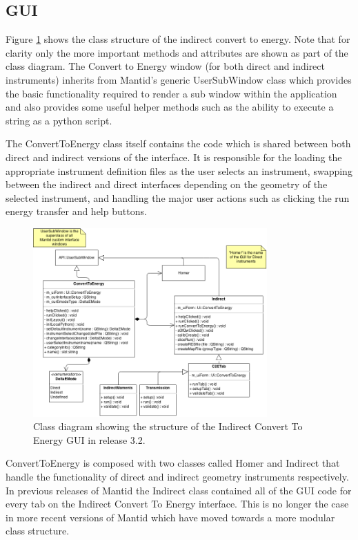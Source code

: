 \documentclass[paper=a4, fontsize=11pt]{scrartcl}	%
\numberwithin{equation}{section}															%
\numberwithin{figure}{section}																%
\numberwithin{table}{section}																%
\begin{document}
\subsection{GUI}
Figure \ref{fig:c2e-class-diagram} shows the class structure of the indirect convert to energy. Note that for clarity only the more important methods and attributes are shown as part of the class diagram. The Convert to Energy window (for both direct and indirect instruments) inherits from Mantid's generic UserSubWindow class which provides the basic functionality required to render a sub window within the application and also provides some useful helper methods such as the ability to execute a string as a python script.

The ConvertToEnergy class itself contains the code which is shared between both direct and indirect versions of the interface. It is responsible for the loading the appropriate instrument definition files as the user selects an instrument, swapping between the indirect and direct interfaces depending on the geometry of the selected instrument, and handling the major user actions such as clicking the run energy transfer and help buttons.

\begin{figure}[H]
\centering
\includegraphics[width=0.8\textwidth]{img/uml/class_diagrams/C2E_structure.png}
\caption{Class diagram showing the structure of the Indirect Convert To Energy GUI in release 3.2.}
\label{fig:c2e-class-diagram}
\end{figure}

ConvertToEnergy is composed with two classes called Homer and Indirect that handle the functionality of direct and indirect geometry instruments respectively. In previous releases of Mantid the Indirect class contained all of the GUI code for every tab on the Indirect Convert To Energy interface. This is no longer the case in more recent versions of Mantid which have moved towards a more modular class structure.
\end{document}
